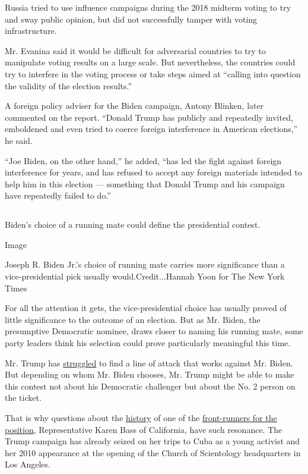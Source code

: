 Russia tried to use influence campaigns during the 2018 midterm voting
to try and sway public opinion, but did not successfully tamper with
voting infrastructure.

Mr. Evanina said it would be difficult for adversarial countries to try
to manipulate voting results on a large scale. But nevertheless, the
countries could try to interfere in the voting process or take steps
aimed at ``calling into question the validity of the election results.''

A foreign policy adviser for the Biden campaign, Antony Blinken, later
commented on the report. ``Donald Trump has publicly and repeatedly
invited, emboldened and even tried to coerce foreign interference in
American elections,'' he said.

``Joe Biden, on the other hand,'' he added, ``has led the fight against
foreign interference for years, and has refused to accept any foreign
materials intended to help him in this election --- something that
Donald Trump and his campaign have repeatedly failed to do.''

\hypertarget{-1}{%
\subsection{}\label{-1}}

Biden's choice of a running mate could define the presidential contest.

Image

Joseph R. Biden Jr.'s choice of running mate carries more significance
than a vice-presidential pick usually would.Credit...Hannah Yoon for The
New York Times

For all the attention it gets, the vice-presidential choice has usually
proved of little significance to the outcome of an election. But as Mr.
Biden, the presumptive Democratic nominee, draws closer to naming his
running mate, some party leaders think his selection could prove
particularly meaningful this time.

Mr. Trump has
\href{https://www.nytimes3xbfgragh.onion/2020/07/10/us/biden-trump.html}{struggled}
to find a line of attack that works against Mr. Biden. But depending on
whom Mr. Biden chooses, Mr. Trump might be able to make this contest not
about his Democratic challenger but about the No. 2 person on the
ticket.

That is why questions about the
\href{https://www.politico.com/news/2020/08/04/karen-bass-eulogized-communist-party-usa-leader-391455}{history}
of one of the
\href{https://www.nytimes3xbfgragh.onion/2020/08/04/us/politics/karen-bass-vice-president-biden.html}{front-runners
for the position}, Representative Karen Bass of California, have such
resonance. The Trump campaign has already seized on her trips to Cuba as
a young activist and her 2010 appearance at the opening of the Church of
Scientology headquarters in Los Angeles.

